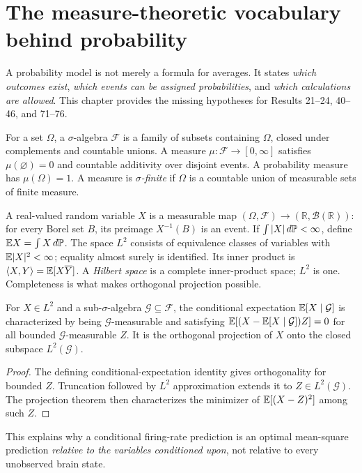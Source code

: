\chapter[Measure and probability vocabulary]{The measure-theoretic vocabulary behind probability}
\label{ch:measure-vocabulary}
A probability model is not merely a formula for averages. It states
\emph{which outcomes exist}, \emph{which events can be assigned
probabilities}, and \emph{which calculations are allowed}.
This chapter provides the missing hypotheses for Results 21--24,
40--46, and 71--76.

\begin{definition}
For a set $\Omega$, a $\sigma$-algebra $\mathcal F$ is a family of
subsets containing $\Omega$, closed under complements and countable
unions. A measure $\mu:\mathcal F\to[0,\infty]$ satisfies
$\mu(\varnothing)=0$ and countable additivity over disjoint events.
A probability measure has $\mu(\Omega)=1$. A measure is
\emph{$\sigma$-finite} if $\Omega$ is a countable union of
measurable sets of finite measure.
\end{definition}
\begin{definition}
A real-valued random variable $X$ is a measurable map
$(\Omega,\mathcal F)\to(\mathbb R,\mathcal B(\mathbb R))$:
for every Borel set $B$, its preimage $X^{-1}(B)$ is an event.
If $\int|X|\,d\mathbb{P}<\infty$, define $\mathbb{E} X=\int X\,d\mathbb{P}$.
The space $L^2$ consists of equivalence classes of variables with
$\mathbb{E}|X|^2<\infty$; equality almost surely is identified.
Its inner product is $\langle X,Y\rangle=\mathbb{E}[X\overline Y]$.
A \emph{Hilbert space} is a complete inner-product space; $L^2$
is one. Completeness is what makes orthogonal projection possible.
\end{definition}
\begin{proposition}
For $X\in L^2$ and a sub-$\sigma$-algebra $\mathcal G\subseteq
\mathcal F$, the conditional expectation $\mathbb{E}[X\mid\mathcal G]$
is characterized by being $\mathcal G$-measurable and satisfying
$\mathbb{E}[(X-\mathbb{E}[X\mid\mathcal G])Z]=0$ for all bounded
$\mathcal G$-measurable $Z$. It is the orthogonal projection of
$X$ onto the closed subspace $L^2(\mathcal G)$.
\end{proposition}
\begin{proof}
The defining conditional-expectation identity gives orthogonality
for bounded $Z$. Truncation followed by $L^2$ approximation
extends it to $Z\in L^2(\mathcal G)$.
The projection theorem then characterizes the minimizer of
$\mathbb{E}[(X-Z)^2]$ among such $Z$.
\end{proof}
This explains why a conditional firing-rate prediction is an
optimal mean-square prediction \emph{relative to the variables
conditioned upon}, not relative to every unobserved brain state.

